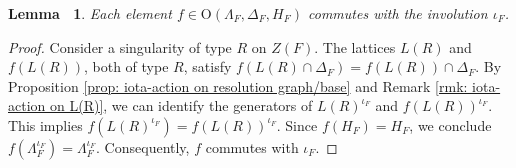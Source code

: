 \documentclass[12pt,reqno,a4paper]{amsart}
\newtheorem{lem}[thm]{Lemma~}
\theoremstyle{remark}
\theoremstyle{definition}
\newcommand\Or{\mathrm{O}}
\newcommand{\red}{\textcolor{red}}
\begin{document}
\begin{lem}%
\label{lem: Aut(Lambda_F,H_F,Delta_F) commutes with iota_F}
Each element $f\in \Or(\Lambda_{F}, \Delta_{F},H_{F})$ commutes with the involution $\iota_{F}$.
\end{lem}
\begin{proof}
Consider a singularity of type $R$ on $Z(F)$. The lattices $L(R)$ and $f(L(R))$, both of type $R$, satisfy $f(L(R)\cap \Delta_{F}) = f(L(R))\cap \Delta_{F}$. 
By Proposition \ref{prop: iota-action on resolution graph/base} and Remark \ref{rmk: iota-action on L(R)}, we can identify the generators of $L(R)^{\iota_{F}}$ and $f(L(R))^{\iota_{F}}$. 
This implies $f(L(R)^{\iota_{F}}) = f(L(R))^{\iota_{F}}$. 
Since $f(H_{F})=H_{F}$, we conclude $f(\Lambda_{F}^{\iota_{F}})=\Lambda_{F}^{\iota_{F}}$. 
Consequently, $f$ commutes with $\iota_{F}$.
\end{proof}
\end{document}
